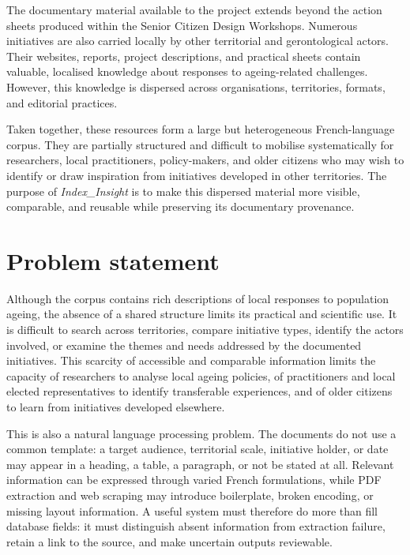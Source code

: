 \documentclass[
11pt,
english,
singlespacing,
headsepline,
]{MastersDoctoralThesis}
\begin{document}
The documentary material available to the project extends beyond the action sheets
produced within the Senior Citizen Design Workshops. Numerous initiatives are also
carried locally by other territorial and gerontological actors. Their websites,
reports, project descriptions, and practical sheets contain valuable, localised
knowledge about responses to ageing-related challenges. However, this knowledge is
dispersed across organisations, territories, formats, and editorial practices.

Taken together, these resources form a large but heterogeneous French-language
corpus. They are partially structured and difficult to mobilise systematically for
researchers, local practitioners, policy-makers, and older citizens who may wish
to identify or draw inspiration from initiatives developed in other territories.
The purpose of \textit{Index\_Insight} is to make this dispersed material more
visible, comparable, and reusable while preserving its documentary provenance.

\section{Problem statement}

Although the corpus contains rich descriptions of local responses to population
ageing, the absence of a shared structure limits its practical and scientific use.
It is difficult to search across territories, compare initiative types, identify the
actors involved, or examine the themes and needs addressed by the documented
initiatives. This scarcity of accessible and comparable information limits the
capacity of researchers to analyse local ageing policies, of practitioners and local
elected representatives to identify transferable experiences, and of older citizens
to learn from initiatives developed elsewhere.

This is also a natural language processing problem. The documents do not use a
common template: a target audience, territorial scale, initiative holder, or date
may appear in a heading, a table, a paragraph, or not be stated at all. Relevant
information can be expressed through varied French formulations, while PDF
extraction and web scraping may introduce boilerplate, broken encoding, or missing
layout information. A useful system must therefore do more than fill database
fields: it must distinguish absent information from extraction failure, retain a
link to the source, and make uncertain outputs reviewable.
\end{document}
